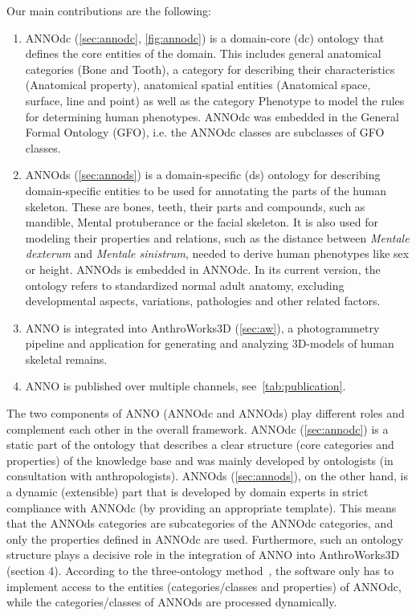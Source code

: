 \documentclass[sw]{iosart2x}
\newcommand{\aw}{AnthroWorks3D}
\newcommand{\latin}[1]{\emph{#1}}
\begin{document}
%
Our main contributions are the following:
\begin{enumerate}
\item ANNOdc (\cref{sec:annodc}, \cref{fig:annodc}) is a domain-core (dc) ontology that defines the core entities of the domain.
This includes general anatomical categories (Bone and Tooth), a category for describing their characteristics (Anatomical property), anatomical spatial entities (Anatomical space, surface, line and point) as well as the category Phenotype to model the rules for determining human phenotypes.
ANNOdc was embedded in the General Formal Ontology (GFO), i.e. the ANNOdc classes are subclasses of GFO classes.
%
\item ANNOds (\cref{sec:annods}) is a domain-specific (ds) ontology for describing domain-specific entities to be used for annotating the parts of the human skeleton.
These are bones, teeth, their parts and compounds, such as mandible, Mental protuberance or the facial skeleton.
It is also used for modeling their properties and relations, such as the distance between \latin{Mentale dexterum} and \latin{Mentale sinistrum}, needed to derive human phenotypes like sex or height.
ANNOds is embedded in ANNOdc.
In its current version, the ontology refers to standardized normal adult anatomy, excluding developmental aspects, variations, pathologies and other related factors.
%
\item ANNO is integrated into \aw{} (\cref{sec:aw}), a photogrammetry pipeline and application for generating and analyzing 3D-models of human skeletal remains.
%
\item ANNO is published over multiple channels, see~\cref{tab:publication}.
%
\end{enumerate}

The two components of ANNO (ANNOdc and ANNOds) play different roles and complement each other in the overall framework.
ANNOdc (\cref{sec:annodc}) is a static part of the ontology that describes a clear structure (core categories and properties) of the knowledge base and was mainly developed by ontologists (in consultation with anthropologists).
ANNOds (\cref{sec:annods}), on the other hand, is a dynamic (extensible) part that is developed by domain experts in strict compliance with ANNOdc (by providing an appropriate template).
This means that the ANNOds categories are subcategories of the ANNOdc categories, and only the properties defined in ANNOdc are used.
Furthermore, such an ontology structure plays a decisive role in the integration of ANNO into AnthroWorks3D (section 4).
According to the three-ontology method~\citep{threeontologymethod}, the software only has to implement access to the entities (categories/classes and properties) of ANNOdc, while the categories/classes of ANNOds are processed dynamically.
\end{document}
